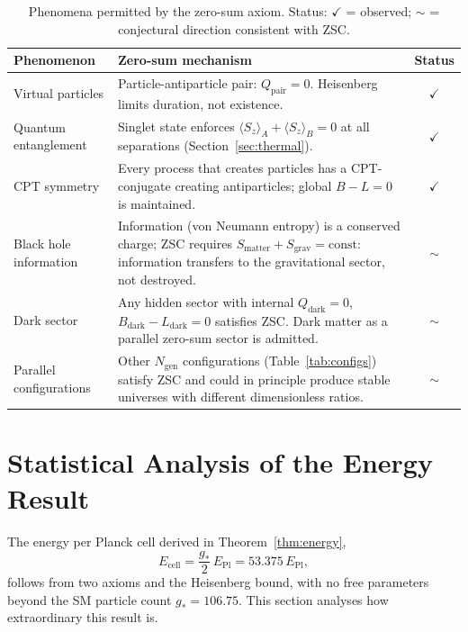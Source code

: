 \documentclass[12pt,a4paper]{article}
\theoremstyle{definition}
\theoremstyle{remark}
\newcommand{\EPl}{E_{\mathrm{Pl}}}
\newcommand{\gstar}{g_{*}}
\begin{document}
\begin{table}[ht]
\centering
\caption{Phenomena permitted by the zero-sum axiom. Status:
$\checkmark$ = observed; $\sim$ = conjectural direction consistent with ZSC.}
\label{tab:exotic}
\begin{tabular}{p{3.2cm}p{6.8cm}c}
\toprule
Phenomenon & Zero-sum mechanism & Status \\
\midrule
Virtual particles &
  Particle-antiparticle pair: $Q_\mathrm{pair}=0$. Heisenberg limits
  duration, not existence. & $\checkmark$ \\
Quantum entanglement &
  Singlet state enforces $\langle S_z\rangle_A + \langle S_z\rangle_B = 0$
  at all separations (Section~\ref{sec:thermal}). & $\checkmark$ \\
CPT symmetry &
  Every process that creates particles has a CPT-conjugate creating
  antiparticles; global $B-L=0$ is maintained. & $\checkmark$ \\
Black hole information &
  Information (von Neumann entropy) is a conserved charge; ZSC requires
  $S_\mathrm{matter} + S_\mathrm{grav} = \mathrm{const}$: information
  transfers to the gravitational sector, not destroyed. & $\sim$ \\
Dark sector &
  Any hidden sector with internal $Q_\mathrm{dark}=0$,
  $B_\mathrm{dark}-L_\mathrm{dark}=0$ satisfies ZSC.
  Dark matter as a parallel zero-sum sector is admitted. & $\sim$ \\
Parallel configurations &
  Other $N_\mathrm{gen}$ configurations (Table~\ref{tab:configs}) satisfy ZSC
  and could in principle produce stable universes with
  different dimensionless ratios. & $\sim$ \\
\bottomrule
\end{tabular}
\end{table}


\section{Statistical Analysis of the Energy Result}
\label{sec:stats}

The energy per Planck cell derived in Theorem~\ref{thm:energy},
\begin{equation}
  E_\mathrm{cell} = \frac{\gstar}{2}\,\EPl = 53.375\,\EPl,
\end{equation}
follows from two axioms and the Heisenberg bound, with no free parameters
beyond the SM particle count $\gstar = 106.75$.
This section analyses how extraordinary this result is.
\end{document}
